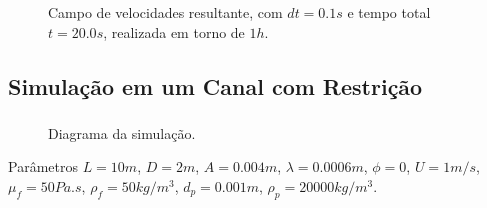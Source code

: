 \documentclass{beamer}
\begin{document}
\begin{frame}
  \frametitle{\subsecname}
  \begin{figure}
     {\raggedleft \tiny Campo de velocidades resultante, com $dt=0.1s$ e tempo total $t=20.0s$, realizada em torno de $1h$.}
  \end{figure}
\end{frame}

\subsection*{Simulação em um Canal com Restrição}
\begin{frame}
  \frametitle{\subsecname}
  
  \begin{figure}
     {\raggedleft \tiny Diagrama da simulação.}
  \end{figure}
  \begin{block}{Parâmetros}
    $L=10m$, $D=2m$, $A=0.004m$, $\lambda=0.0006m$, $\phi=0$, $U=1m/s$, $\mu_f=50Pa.s$, $\rho_f=50kg/m^3$, $d_p=0.001m$, $\rho_p=20000kg/m^3$.
  \end{block}
\end{frame}
\end{document}
